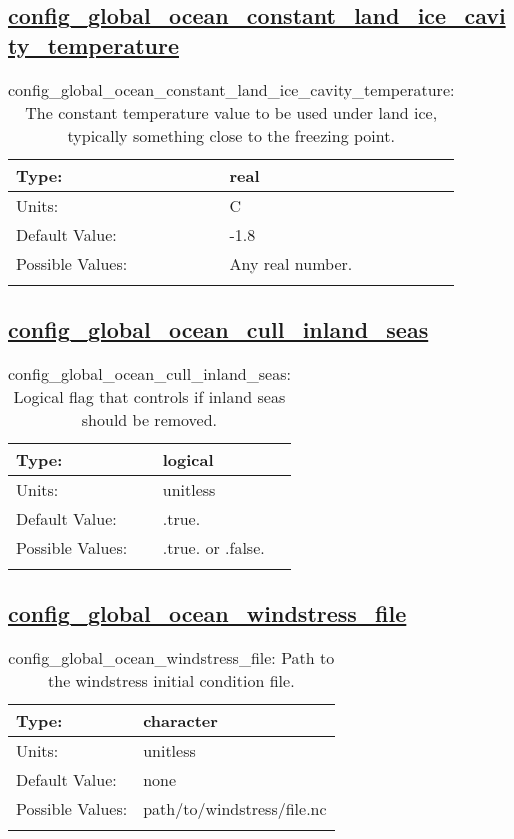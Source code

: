 \subsection[config\_global\_ocean\_constant\_land\_ice\_cavity\_temperature]{\hyperref[sec:nm_tab_global_ocean]{config\_global\_ocean\_constant\_land\_ice\_cavity\_temperature}}
\label{subsec:nm_sec_config_global_ocean_constant_land_ice_cavity_temperature}
\begin{center}
\begin{longtable}{| p{2.0in} || p{4.0in} |}
    \hline
    Type: & real \\
    \hline
    Units: & \si{C} \\
    \hline
    Default Value: & -1.8 \\
    \hline
    Possible Values: & Any real number. \\
    \hline
    \caption{config\_global\_ocean\_constant\_land\_ice\_cavity\_temperature: The constant temperature value to be used under land ice, typically something close to the freezing point.}
\end{longtable}
\end{center}
\subsection[config\_global\_ocean\_cull\_inland\_seas]{\hyperref[sec:nm_tab_global_ocean]{config\_global\_ocean\_cull\_inland\_seas}}
\label{subsec:nm_sec_config_global_ocean_cull_inland_seas}
\begin{center}
\begin{longtable}{| p{2.0in} || p{4.0in} |}
    \hline
    Type: & logical \\
    \hline
    Units: & \si{unitless} \\
    \hline
    Default Value: & .true. \\
    \hline
    Possible Values: & .true. or .false. \\
    \hline
    \caption{config\_global\_ocean\_cull\_inland\_seas: Logical flag that controls if inland seas should be removed.}
\end{longtable}
\end{center}
\subsection[config\_global\_ocean\_windstress\_file]{\hyperref[sec:nm_tab_global_ocean]{config\_global\_ocean\_windstress\_file}}
\label{subsec:nm_sec_config_global_ocean_windstress_file}
\begin{center}
\begin{longtable}{| p{2.0in} || p{4.0in} |}
    \hline
    Type: & character \\
    \hline
    Units: & \si{unitless} \\
    \hline
    Default Value: & none \\
    \hline
    Possible Values: & path/to/windstress/file.nc \\
    \hline
    \caption{config\_global\_ocean\_windstress\_file: Path to the windstress initial condition file.}
\end{longtable}
\end{center}
